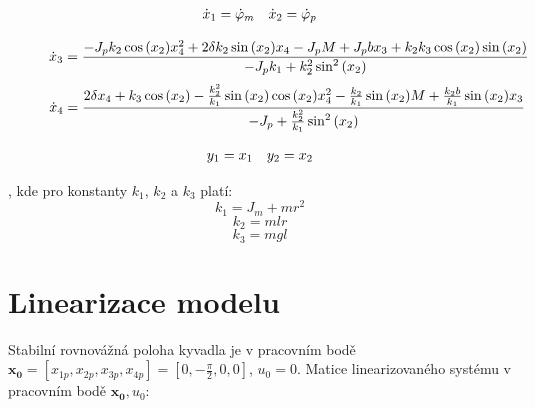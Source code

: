 \documentclass[11pt,a4paper]{article}
\begin{document}
\begin{align*}
& \xd{1} = \phid{m}    &&	\xd{2} = \phid{p} \\
\end{align*}
\begin{figure}[H]
\vspace*{-1.3 cm}
$$
\xd{3} =
\frac{
	-J_p k_2 \coss{\x{2}} \x{4}^2 + 2 \delta k_2 \sinn{\x{2}} \x{4} - J_p \M + J_p b \x{3} 	+ k_2 k_3 \coss{\x{2}} \sinn{\x{2}}
}{
 	-J_p k_1 + k_2^2 \sinnN{\x{2}}
}
$$
$$
\xd{4} =
\frac{
	2 \delta \x{4} + k_3 \coss{\x{2}} - \frac{k_2^2}{k_1} \sinn{\x{2}} \coss{\x{2}} 			 	\x{4}^2 - \frac{k_2}{k_1} \sinn{\x{2}} M + \frac{k_2 b}{k_1} \sinn{\x{2}} \x{3}
}{
	-J_p + \frac{k_2^2}{k_1} \sinnN{\x{2}}
}
$$
\end{figure}
\begin{figure}[H]
\vspace*{-1.3 cm}
\begin{align*}
& \y{1} = \x{1}			 &&		\y{2} = \x{2} \\
\end{align*}
\end{figure}

, kde pro konstanty $k_1$, $k_2$ a $k_3$ platí:
$$
k_1 = J_m + m r^2
$$
$$
k_2 = m l r
$$
$$
k_3 = m g l
$$



\section{Linearizace modelu}
Stabilní rovnovážná poloha kyvadla je v pracovním bodě $\mathbf{x_0} = [x_{1p}, x_{2p}, x_{3p}, x_{4p}] = [0, -\frac{\pi}{2}, 0, 0]$, ${u_0} = 0$.
\newline
Matice linearizovaného systému v pracovním bodě $\mathbf{x_0}, u_0$:
\end{document}
